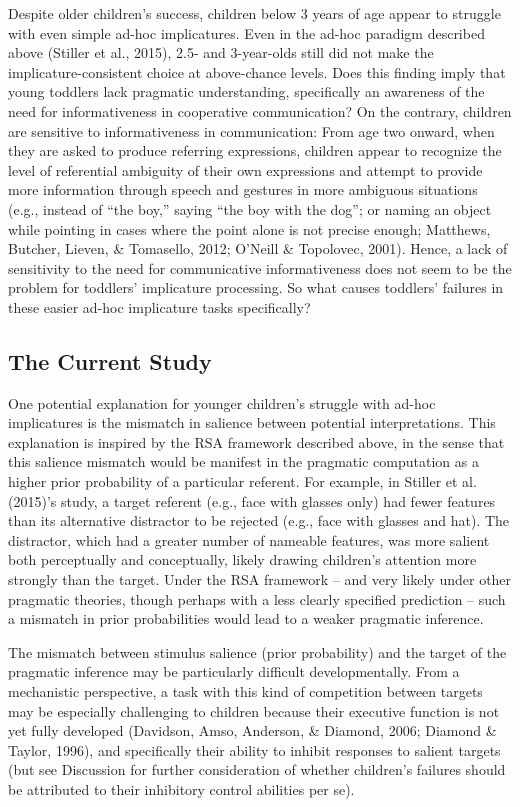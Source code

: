 \documentclass[mask,man]{apa6}
\begin{document}
Despite older children's success, children below 3 years of age appear
to struggle with even simple ad-hoc implicatures. Even in the ad-hoc
paradigm described above (Stiller et al., 2015), 2.5- and 3-year-olds
still did not make the implicature-consistent choice at above-chance
levels. Does this finding imply that young toddlers lack pragmatic
understanding, specifically an awareness of the need for informativeness
in cooperative communication? On the contrary, children are sensitive to
informativeness in communication: From age two onward, when they are
asked to produce referring expressions, children appear to recognize the
level of referential ambiguity of their own expressions and attempt to
provide more information through speech and gestures in more ambiguous
situations (e.g., instead of ``the boy,'' saying ``the boy with the
dog''; or naming an object while pointing in cases where the point alone
is not precise enough; Matthews, Butcher, Lieven, \& Tomasello, 2012;
O'Neill \& Topolovec, 2001). Hence, a lack of sensitivity to the need
for communicative informativeness does not seem to be the problem for
toddlers' implicature processing. So what causes toddlers' failures in
these easier ad-hoc implicature tasks specifically?

\subsection{The Current Study}\label{the-current-study}

One potential explanation for younger children's struggle with ad-hoc
implicatures is the mismatch in salience between potential
interpretations. This explanation is inspired by the RSA framework
described above, in the sense that this salience mismatch would be
manifest in the pragmatic computation as a higher prior probability of a
particular referent. For example, in Stiller et al. (2015)'s study, a
target referent (e.g., face with glasses only) had fewer features than
its alternative distractor to be rejected (e.g., face with glasses and
hat). The distractor, which had a greater number of nameable features,
was more salient both perceptually and conceptually, likely drawing
children's attention more strongly than the target. Under the RSA
framework -- and very likely under other pragmatic theories, though
perhaps with a less clearly specified prediction -- such a mismatch in
prior probabilities would lead to a weaker pragmatic inference.

The mismatch between stimulus salience (prior probability) and the
target of the pragmatic inference may be particularly difficult
developmentally. From a mechanistic perspective, a task with this kind
of competition between targets may be especially challenging to children
because their executive function is not yet fully developed (Davidson,
Amso, Anderson, \& Diamond, 2006; Diamond \& Taylor, 1996), and
specifically their ability to inhibit responses to salient targets (but
see Discussion for further consideration of whether children's failures
should be attributed to their inhibitory control abilities per se).
\end{document}
